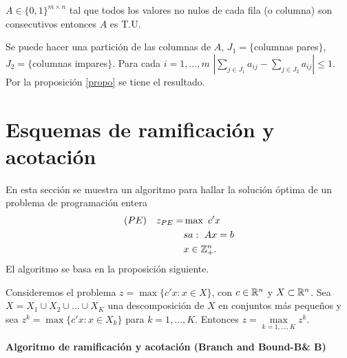 \documentclass[PM.tex]{subfiles}
\begin{document}
\begin{prop}
$A\in\{0,1\}^{m\times n}$ tal que todos los valores no nulos de cada fila (o columna) son consecutivos entonces $A$ es T.U. 
\end{prop}
\begin{dem}
Se puede hacer una partición de las columnas de $A$, $J_1=\{$columnas pares$\}$, $J_2=\{$columnas impares$\}$. Para cada $i=1,\dots,m$ $|\sum_{j\in J_1}a_{ij}-\sum_{j\in J_2}a_{ij}|\leq 1$. Por la proposición \ref{propo} se tiene el resultado. 
\end{dem}

\section{Esquemas de ramificación y acotación}

En esta sección se muestra un algoritmo para hallar la solución óptima de un problema de programación entera
\begin{align*}
(PE)\quad z_{PE} = & \max\ c'x\\
               & sa:\ Ax=b\\
     		&x\in\mathbb{Z}_+^n.
\end{align*}
El algoritmo se basa en la proposición siguiente. 
\begin{prop}
Consideremos el problema $z=\max\{c'x:x\in X\}$, con $c\in\mathbb{R}^n$ y $X\subset\mathbb{R}^n$. Sea $X=X_1\cup X_2\cup\dots\cup X_K$ una descomposición de $X$ en conjuntos más pequeños y sea $z^k=\max\{c'x:x\in X_k\}$ para $k=1,\dots,K$. Entonces $z=\underset{k=1,\dots,K}{\max} z^k$.
\end{prop}

\begin{center}
{\bf Algoritmo de ramificación y acotación (Branch and Bound-B\& B)}
\end{center}
\end{document}
